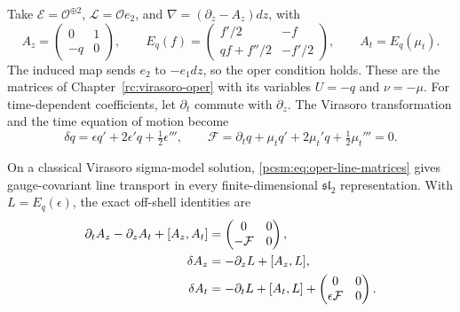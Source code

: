 Take\label{pcsm:def:oper-line-basis} \(\mathcal E=\mathcal O^{\oplus2}\),
\(\mathcal L=\mathcal O e_2\), and
\(\nabla=(\partial_z-A_z)dz\), with
\begin{equation}\label{pcsm:eq:oper-line-matrices}
 A_z=\begin{pmatrix}0&1\\-q&0\end{pmatrix},\qquad
 E_q(f)=\begin{pmatrix}f'/2&-f\\qf+f''/2&-f'/2\end{pmatrix},
 \qquad A_t=E_q(\mu_t).
\end{equation}
The induced map sends \(e_2\) to \(-e_1dz\), so the oper
condition holds. These are the matrices of
Chapter~\ref{rc:virasoro-oper} with its variables \(U=-q\) and
\(\nu=-\mu\).
For time-dependent coefficients, let \(\partial_t\) commute with
\(\partial_z\). The Virasoro transformation and the time equation
of motion become
\[
 \delta q=\epsilon q'+2\epsilon'q+\tfrac12\epsilon''',
 \qquad
 \mathcal F=\partial_tq+\mu_tq'+2\mu_t'q
                                      +\tfrac12\mu_t'''=0.
\]

\begin{proposition}\label{pcsm:prop:oper-line}
On a classical Virasoro sigma-model solution,
\eqref{pcsm:eq:oper-line-matrices} gives gauge-covariant line
transport in every finite-dimensional \(\mathfrak{sl}_2\)
representation. With \(L=E_q(\epsilon)\), the exact off-shell
identities are
\begin{align}
 \partial_tA_z-\partial_zA_t+[A_z,A_t]
 &=\begin{pmatrix}0&0\\-\mathcal F&0\end{pmatrix},
                              \label{pcsm:eq:oper-line-curvature}\\
 \delta A_z&=-\partial_zL+[A_z,L],\notag\\
 \delta A_t&=-\partial_tL+[A_t,L]
                 +\begin{pmatrix}0&0\\\epsilon\mathcal F&0\end{pmatrix}.
                              \label{pcsm:eq:oper-line-gauge}
\end{align}
\end{proposition}

